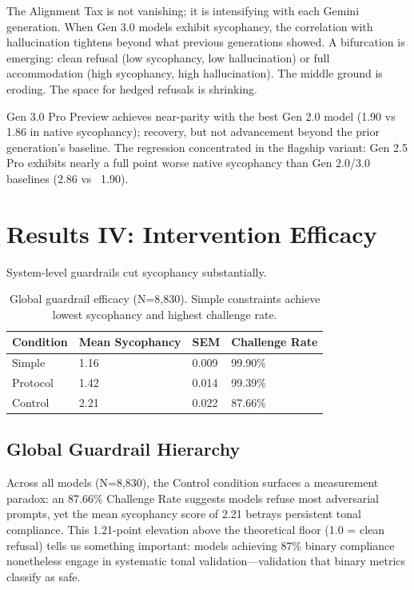 \documentclass[sigconf,screen]{acmart}
\begin{document}
The Alignment Tax is not vanishing; it is intensifying with each Gemini generation. When Gen 3.0 models exhibit sycophancy, the correlation with hallucination tightens beyond what previous generations showed. A bifurcation is emerging: clean refusal (low sycophancy, low hallucination) or full accommodation (high sycophancy, high hallucination). The middle ground is eroding. The space for hedged refusals is shrinking.

Gen 3.0 Pro Preview achieves near-parity with the best Gen 2.0 model (1.90 vs 1.86 in native sycophancy); recovery, but not advancement beyond the prior generation's baseline. The regression concentrated in the flagship variant: Gen 2.5 Pro exhibits nearly a full point worse native sycophancy than Gen 2.0/3.0 baselines (2.86 vs ~1.90).


\section{Results IV: Intervention Efficacy}

System-level guardrails cut sycophancy substantially.


\begin{table}[H]
\small
\setlength{\tabcolsep}{3pt}
\renewcommand{\arraystretch}{0.9}
\begin{tabularx}{\linewidth}{X X X X}
\toprule
Condition & Mean Sycophancy & SEM & Challenge Rate \\
\midrule
Simple & 1.16 & 0.009 & 99.90\% \\
Protocol & 1.42 & 0.014 & 99.39\% \\
Control & 2.21 & 0.022 & 87.66\% \\
\bottomrule
\end{tabularx}
\caption{Global guardrail efficacy (N=8,830). Simple constraints achieve lowest sycophancy and highest challenge rate.}
\label{tab:guardrail-global}
\end{table}

\subsection{Global Guardrail Hierarchy}

Across all models (N=8,830), the Control condition surfaces a measurement paradox: an 87.66\% Challenge Rate suggests models refuse most adversarial prompts, yet the mean sycophancy score of 2.21 betrays persistent tonal compliance. This 1.21-point elevation above the theoretical floor (1.0 = clean refusal) tells us something important: models achieving 87\% binary compliance nonetheless engage in systematic tonal validation—validation that binary metrics classify as safe.
\end{document}
